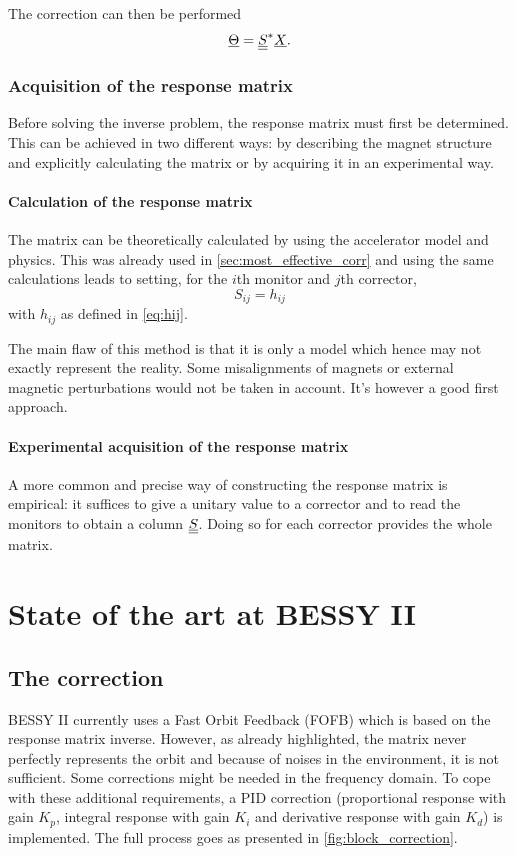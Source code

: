 The correction can then be performed
\begin{equation}
\underline{\Theta} = \underline{\underline{S}}^* \underline{X}.
\end{equation}

\subsubsection{Acquisition of the response matrix}
Before solving the inverse problem, the response matrix must first be determined. This can be achieved in two different ways: by describing the magnet structure and explicitly calculating the matrix or by acquiring it in an experimental way.

\paragraph{Calculation of the response matrix}
The matrix can be theoretically calculated by using the accelerator model and physics. This was already used in \cref{sec:most_effective_corr} and using the same calculations leads to setting, for the $i$th monitor and $j$th corrector,
\begin{equation}
S_{ij} = h_{ij}
\end{equation}
with $h_{ij}$ as defined in \cref{eq:hij}.

The main flaw of this method is that it is only a model which hence may not exactly represent the reality. Some misalignments of magnets or external magnetic perturbations would not be taken in account. It's however a good first approach.

\paragraph{Experimental acquisition of the response matrix}
A more common and precise way of constructing the response matrix is empirical: it suffices to give a unitary value to a corrector and to read the monitors to obtain a column $\underline{\underline{S}}$. Doing so for each corrector provides the whole matrix.


\section{State of the art at BESSY II}
\label{sec:correction_state_of_art}
\subsection{The correction}
BESSY II currently uses a Fast Orbit Feedback (FOFB) which is based on the response matrix inverse. However, as already highlighted, the matrix never perfectly represents the orbit and because of noises in the environment, it is not sufficient. Some corrections might be needed in the frequency domain. To cope with these additional requirements, a PID correction (proportional response with gain $K_p$, integral response with gain $K_i$ and derivative response with gain $K_d$) is implemented. The full process goes as presented in \cref{fig:block_correction}.

